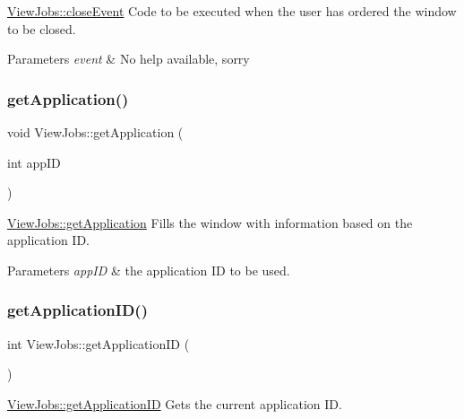 \hyperlink{class_view_jobs_a832503ca9eb4e4bf79c2fb48a59141aa}{View\+Jobs\+::close\+Event} Code to be executed when the user has ordered the window to be closed. 


\begin{DoxyParams}{Parameters}
{\em event} & No help available, sorry \\
\hline
\end{DoxyParams}
\mbox{\label{class_view_jobs_ae9c1c806aa1dd5082b38a1dc9cbec39e}} 
\subsubsection{\texorpdfstring{get\+Application()}{getApplication()}}
{\footnotesize\ttfamily void View\+Jobs\+::get\+Application (\begin{DoxyParamCaption}\item[{int}]{app\+ID }\end{DoxyParamCaption})}



\hyperlink{class_view_jobs_ae9c1c806aa1dd5082b38a1dc9cbec39e}{View\+Jobs\+::get\+Application} Fills the window with information based on the application ID. 


\begin{DoxyParams}{Parameters}
{\em app\+ID} & the application ID to be used. \\
\hline
\end{DoxyParams}
\mbox{\label{class_view_jobs_a086650882ad80acb4074cf697f8cddcb}} 
\subsubsection{\texorpdfstring{get\+Application\+I\+D()}{getApplicationID()}}
{\footnotesize\ttfamily int View\+Jobs\+::get\+Application\+ID (\begin{DoxyParamCaption}{ }\end{DoxyParamCaption})}



\hyperlink{class_view_jobs_a086650882ad80acb4074cf697f8cddcb}{View\+Jobs\+::get\+Application\+ID} Gets the current application ID. 

